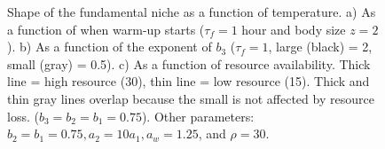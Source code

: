 \begin{figure}[H]
\begin{center}
\caption{
	Shape of the fundamental niche as a function of temperature.
	a) As a function of when warm-up starts ($\tau_f = 1$ hour and body size $z = 2$). %
	b) As a function of the exponent of $b_3$ ($\tau_f = 1$, large (black) = 2, small (gray) = 0.5).
	c)  As a function of resource availability. 
	Thick line = high resource (30), thin line = low resource (15).
	Thick and thin gray lines overlap because the small is not affected by resource loss. 
	  ($b_3 = b_2 = b_1 = 0.75$).
	Other parameters: $ b_2 = b_1  = 0.75,  a_2 = 10 a_1, a_w = 1.25$, and  $\rho = 30$.
}%
\label{fig6}
\end{center}
\end{figure}
%
